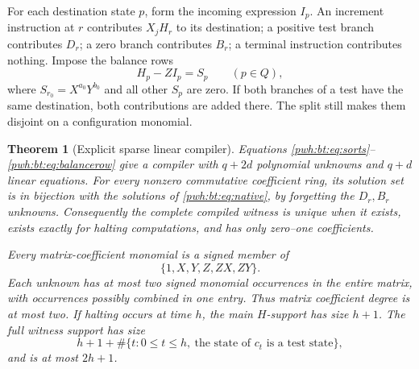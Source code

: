 \documentclass[11pt,letterpaper]{article}
\numberwithin{equation}{section}
\newtheorem{theorem}{Theorem}[section]
\theoremstyle{definition}
\begin{document}
For each destination state $p$, form the incoming expression $I_p$.
An increment instruction at $r$ contributes $X_jH_r$ to its destination;
a positive test branch contributes $D_r$; a zero branch contributes
$B_r$; a terminal instruction contributes nothing. Impose the balance
rows
\begin{equation}\label{pwh:bt:eq:balancerow}
 H_p-ZI_p=S_p\qquad(p\in Q),
\end{equation}
where $S_{r_0}=X^{a_0}Y^{b_0}$ and all other $S_p$ are zero. If both
branches of a test have the same destination, both contributions are
added there. The split still makes them disjoint on a configuration
monomial.

\begin{theorem}[Explicit sparse linear compiler]\label{pwh:bt:thm:compiler}
Equations \eqref{pwh:bt:eq:sorts}--\eqref{pwh:bt:eq:balancerow} give a compiler with
$q+2d$ polynomial unknowns and $q+d$ linear equations. For every nonzero
commutative coefficient ring, its solution set is in bijection with the
solutions of \eqref{pwh:bt:eq:native}, by forgetting the $D_r,B_r$ unknowns.
Consequently the complete compiled witness is unique when it exists,
exists exactly for halting computations, and has only zero--one
coefficients.

Every matrix-coefficient monomial is a signed member of
\[
 \{1,X,Y,Z,ZX,ZY\}.
\]
Each unknown has at most two signed monomial occurrences in the entire
matrix, with occurrences possibly combined in one entry. Thus matrix
coefficient degree is at most two. If halting occurs at time $h$, the
main $H$-support has size $h+1$. The full witness support has size
\begin{equation}\label{pwh:bt:eq:fullsupport}
 h+1+\#\{t:0\le t\le h,\ \text{the state of }c_t\text{ is a test state}\},
\end{equation}
and is at most $2h+1$.
\end{theorem}
\end{document}
